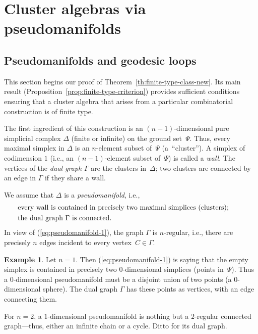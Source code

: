 \documentclass[letterpaper]{amsart}
\numberwithin{equation}{section}
\theoremstyle{definition}
\newtheorem{example}[theorem]{Example}
\begin{document}
\pagebreak[2] 
 
\section{Cluster algebras via pseudomanifolds} 
\label{sec:cluster-algebras-via-pseudomanifolds} 
 
\subsection{Pseudomanifolds and geodesic loops} 
\label{sec:pseudomanifolds} 
 
This section begins our proof of 
Theorem~\ref{th:finite-type-class-new}. 
Its main result (Proposition~\ref{prop:finite-type-criterion}) 
provides sufficient conditions 
ensuring that a cluster algebra that 
arises from a particular combinatorial construction 
is of finite type. 
 
The first ingredient of this construction is an $(n-1)$-dimensional 
pure simplicial complex $\Delta$ (finite or infinite) on the ground set~$\Psi$. 
Thus, every maximal simplex in $\Delta$ is an $n$-element subset of~$\Psi$ 
(a~``cluster''). 
A simplex of codimension $1$ (i.e., an $(n-1)$-element subset 
of~$\Psi$) is called a \emph{wall}. 
The vertices of the \emph{dual graph} $\Gamma$ are the clusters 
in~$\Delta$; 
two clusters are connected by an edge in $\Gamma$ if they share a wall. 
 
We assume that $\Delta$ is a \emph{pseudomanifold}, 
i.e., 
\begin{align} 
\label{eq:pseudomanifold-1} 
&\text{every wall is contained in precisely two 
maximal simplices (clusters);} \hspace{.3in} 
\\ 
\label{eq:pseudomanifold-2} 
&\text{the dual graph $\Gamma$ is connected.} 
\end{align} 
In view of (\ref{eq:pseudomanifold-1}), the graph $\Gamma$ is 
$n$-regular, i.e., there are precisely $n$ 
edges incident to every vertex~$C\in\Gamma$. 
 
\begin{example} 
Let $n=1$. 
Then (\ref{eq:pseudomanifold-1}) is saying that 
the empty simplex is contained in precisely two $0$-dimensional 
simplices (points in~$\Psi$). 
Thus a $0$-dimensional pseudomanifold must be a disjoint union of two points 
(a $0$-dimensional sphere). 
The dual graph $\Gamma$ has these points as vertices, 
with an edge connecting them. 
 
For $n=2$, a $1$-dimensional pseudomanifold is nothing but a 
$2$-regular connected graph---thus, either an infinite chain or a 
cycle. Ditto for its dual graph. 
\end{example} 
 
\end{document}
